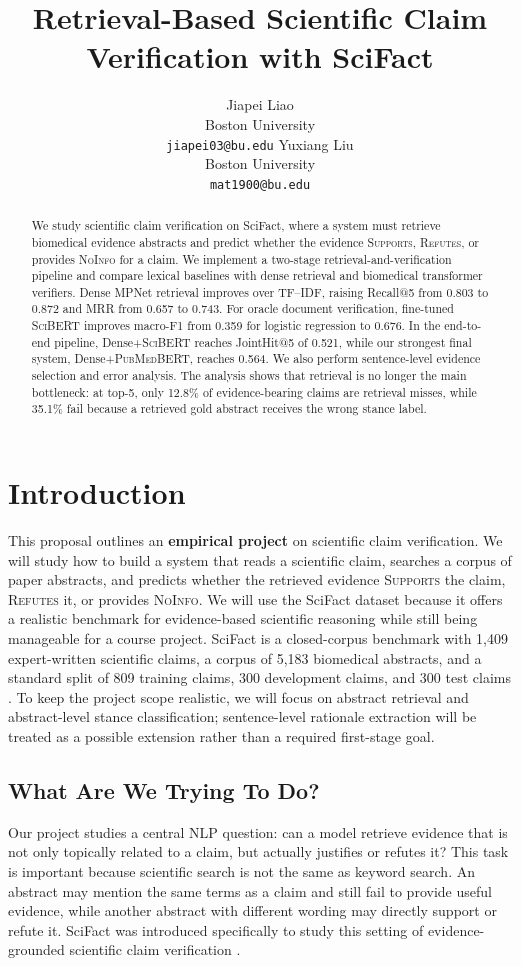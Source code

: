\documentclass[11pt]{article}
\title{Retrieval-Based Scientific Claim Verification with SciFact}
\author{Jiapei Liao \\
  Boston University \\
  \texttt{jiapei03@bu.edu}
  \And
  Yuxiang Liu \\
  Boston University \\
  \texttt{mat1900@bu.edu}}
\begin{document}
\maketitle

\begin{abstract}
We study scientific claim verification on SciFact, where a system must retrieve biomedical evidence abstracts and predict whether the evidence \textsc{Supports}, \textsc{Refutes}, or provides \textsc{NoInfo} for a claim. We implement a two-stage retrieval-and-verification pipeline and compare lexical baselines with dense retrieval and biomedical transformer verifiers. Dense MPNet retrieval improves over TF--IDF, raising Recall@5 from 0.803 to 0.872 and MRR from 0.657 to 0.743. For oracle document verification, fine-tuned \textsc{SciBERT} improves macro-F1 from 0.359 for logistic regression to 0.676. In the end-to-end pipeline, Dense+\textsc{SciBERT} reaches JointHit@5 of 0.521, while our strongest final system, Dense+\textsc{PubMedBERT}, reaches 0.564. We also perform sentence-level evidence selection and error analysis. The analysis shows that retrieval is no longer the main bottleneck: at top-5, only 12.8\% of evidence-bearing claims are retrieval misses, while 35.1\% fail because a retrieved gold abstract receives the wrong stance label.
\end{abstract}

\section{Introduction}
This proposal outlines an \textbf{empirical project} on scientific claim verification. We will study how to build a system that reads a scientific claim, searches a corpus of paper abstracts, and predicts whether the retrieved evidence \textsc{Supports} the claim, \textsc{Refutes} it, or provides \textsc{NoInfo}. We will use the SciFact dataset because it offers a realistic benchmark for evidence-based scientific reasoning while still being manageable for a course project. SciFact is a closed-corpus benchmark with 1,409 expert-written scientific claims, a corpus of 5,183 biomedical abstracts, and a standard split of 809 training claims, 300 development claims, and 300 test claims \citep{wadden2020fact}. To keep the project scope realistic, we will focus on abstract retrieval and abstract-level stance classification; sentence-level rationale extraction will be treated as a possible extension rather than a required first-stage goal.

\subsection{What Are We Trying To Do?}
Our project studies a central NLP question: can a model retrieve evidence that is not only topically related to a claim, but actually justifies or refutes it? This task is important because scientific search is not the same as keyword search. An abstract may mention the same terms as a claim and still fail to provide useful evidence, while another abstract with different wording may directly support or refute it. SciFact was introduced specifically to study this setting of evidence-grounded scientific claim verification \citep{wadden2020fact}.
\end{document}
